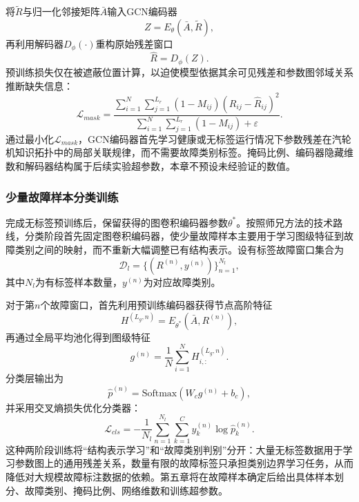 将$\tilde R$与归一化邻接矩阵$\bar A$输入GCN编码器
\begin{equation}
    Z=E_{\theta}(\bar A,\tilde R),
\end{equation}
再利用解码器$D_{\phi}(\cdot)$重构原始残差窗口
\begin{equation}
    \hat R=D_{\phi}(Z).
\end{equation}
预训练损失仅在被遮蔽位置计算，以迫使模型依据其余可见残差和参数图邻域关系推断缺失信息：
\begin{equation}
\mathcal L_{mask}=\frac{\sum_{i=1}^{N}\sum_{j=1}^{L_r}(1-M_{ij})(R_{ij}-\hat R_{ij})^2}{\sum_{i=1}^{N}\sum_{j=1}^{L_r}(1-M_{ij})+\varepsilon}.
\end{equation}
通过最小化$\mathcal L_{mask}$，GCN编码器首先学习健康或无标签运行情况下参数残差在汽轮机知识拓扑中的局部关联规律，而不需要故障类别标签。掩码比例、编码器隐藏维数和解码器结构属于后续实验超参数，本章不预设未经验证的数值。

\subsubsection{少量故障样本分类训练}

完成无标签预训练后，保留获得的图卷积编码器参数$\theta^{*}$。按照师兄方法的技术路线，分类阶段首先固定图卷积编码器，使少量故障样本主要用于学习图级特征到故障类别之间的映射，而不重新大幅调整已有结构表示。设有标签故障窗口集合为
\begin{equation}
    \mathcal D_l=\{(R^{(n)},y^{(n)})\}_{n=1}^{N_l},
\end{equation}
其中$N_l$为有标签样本数量，$y^{(n)}$为对应故障类别。

对于第$n$个故障窗口，首先利用预训练编码器获得节点高阶特征
\begin{equation}
    H^{(L_g,n)}=E_{\theta^{*}}(\bar A,R^{(n)}),
\end{equation}
再通过全局平均池化得到图级特征
\begin{equation}
    g^{(n)}=\frac{1}{N}\sum_{i=1}^{N}H_{i,:}^{(L_g,n)}.
\end{equation}
分类层输出为
\begin{equation}
    \hat p^{(n)}=\mathrm{Softmax}(W_cg^{(n)}+b_c),
\end{equation}
并采用交叉熵损失优化分类器：
\begin{equation}
    \mathcal L_{cls}=-\frac{1}{N_l}\sum_{n=1}^{N_l}\sum_{k=1}^{C}y_k^{(n)}\log\hat p_k^{(n)}.
\end{equation}
这种两阶段训练将“结构表示学习”和“故障类别判别”分开：大量无标签数据用于学习参数图上的通用残差关系，数量有限的故障标签只承担类别边界学习任务，从而降低对大规模故障标注数据的依赖。第五章将在故障样本确定后给出具体样本划分、故障类别、掩码比例、网络维数和训练超参数。

